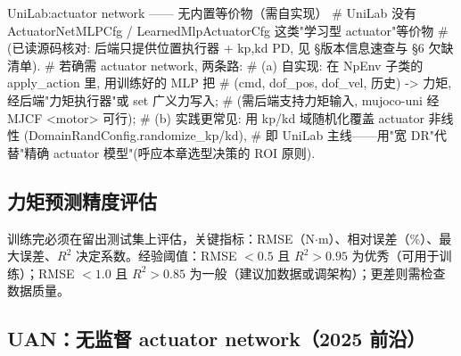 \begin{codebox}[Python]{UniLab:actuator network —— 无内置等价物（需自实现）}
# UniLab 没有 ActuatorNetMLPCfg / LearnedMlpActuatorCfg 这类"学习型 actuator"等价物
# (已读源码核对: 后端只提供位置执行器 + {kp,kd} PD, 见 §版本信息速查与 §6 欠缺清单).
# 若确需 actuator network, 两条路:
#   (a) 自实现: 在 NpEnv 子类的 apply_action 里, 用训练好的 MLP 把
#       (cmd, dof_pos, dof_vel, 历史) -> 力矩, 经后端"力矩执行器"或 set 广义力写入;
#       (需后端支持力矩输入, mujoco-uni 经 MJCF <motor> 可行);
#   (b) 实践更常见: 用 kp/kd 域随机化覆盖 actuator 非线性 (DomainRandConfig.randomize_kp/kd),
#       即 UniLab 主线——用"宽 DR"代替"精确 actuator 模型"(呼应本章选型决策的 ROI 原则).
\end{codebox}


\subsection{力矩预测精度评估}
\label{sec:rlmc-act-net-eval}

训练完必须在留出测试集上评估，关键指标：RMSE（N$\cdot$m）、相对误差（\%）、最大误差、$R^2$ 决定系数。经验阈值：RMSE $<0.5$ 且 $R^2>0.95$ 为优秀（可用于训练）；RMSE $<1.0$ 且 $R^2>0.85$ 为一般（建议加数据或调架构）；更差则需检查数据质量。

\subsection{UAN：无监督 actuator network（2025 前沿）}
\label{sec:rlmc-act-net-uan}

